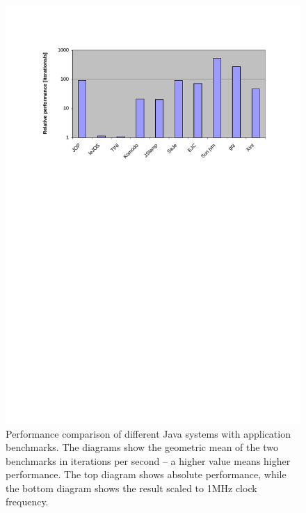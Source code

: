 \begin{figure}
    \includegraphics[width=\excelwidth]{results/results_app_bench_scaled}
    \caption{Performance comparison of different Java systems with
    application benchmarks. The diagrams show the geometric mean
    of the two benchmarks in iterations per second -- a higher
    value means higher performance. The top diagram shows
    absolute performance, while the bottom diagram shows the result
    scaled to 1MHz clock frequency.
    }
    \label{fig:results:app:bench}
\end{figure}


